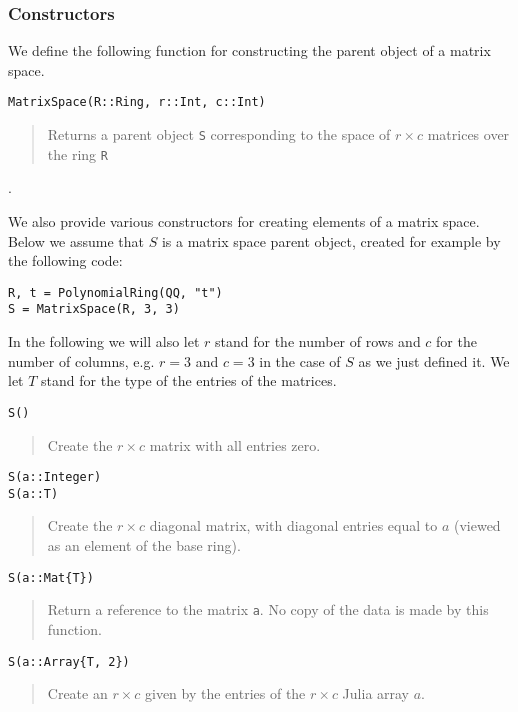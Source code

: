 \documentclass[a4paper,10pt]{article}
\newcommand{\code}{\lstinline}
\newcommand{\desc}[1]{\vspace{-3mm}\begin{quote}#1\end{quote}}
\begin{document}
\subsubsection{Constructors}

We define the following function for constructing the parent object of a
matrix space.

\begin{lstlisting}
MatrixSpace(R::Ring, r::Int, c::Int)
\end{lstlisting}

\desc{Returns a parent object \code{S} corresponding to the space of $r\times c$
matrices over the ring \code{R}}.

We also provide various constructors for creating elements of a matrix space. Below
we assume that $S$ is a matrix space parent object, created for example by the
following code:

\begin{lstlisting}
R, t = PolynomialRing(QQ, "t")
S = MatrixSpace(R, 3, 3)
\end{lstlisting}

In the following we will also let $r$ stand for the number of rows and $c$ for the
number of columns, e.g. $r = 3$ and $c = 3$ in the case of $S$ as we just defined it.
We let $T$ stand for the type of the entries of the matrices.

\begin{lstlisting}
S()
\end{lstlisting}

\desc{Create the $r\times c$ matrix with all entries zero.}

\begin{lstlisting}
S(a::Integer)
S(a::T)
\end{lstlisting}

\desc{Create the $r\times c$ diagonal matrix, with diagonal entries equal to
$a$ (viewed as an element of the base ring).}

\begin{lstlisting}
S(a::Mat{T})
\end{lstlisting}

\desc{Return a reference to the matrix \code{a}. No copy of the data is
made by this function.}

\begin{lstlisting}
S(a::Array{T, 2})
\end{lstlisting}

\desc{Create an $r\times c$ given by the entries of the $r\times c$ Julia array
$a$.}
\end{document}
